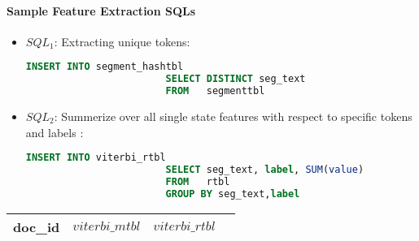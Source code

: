 \paragraph{Sample Feature Extraction SQLs}
\begin{itemize}
\item $SQL_1$: Extracting unique tokens:\\
              \begin{lstlisting}[language=SQL,gobble=4]
                        INSERT INTO segment_hashtbl
                        SELECT DISTINCT seg_text
                        FROM   segmenttbl
              \end{lstlisting}

\item $SQL_2$: Summerize over all single state features with respect to specific tokens and labels :\\
              \begin{lstlisting}[language=SQL,gobble=4]
                        INSERT INTO viterbi_rtbl
                        SELECT seg_text, label, SUM(value)
                        FROM   rtbl
                        GROUP BY seg_text,label
              \end{lstlisting}
\end{itemize}
\begin{center}
    \begin{tabular}{ | l | l | l | l |}
    \hline
    doc\_id & $viterbi\_mtbl$ & $viterbi\_rtbl$ \\
    \hline
    \end{tabular}
\end{center}

